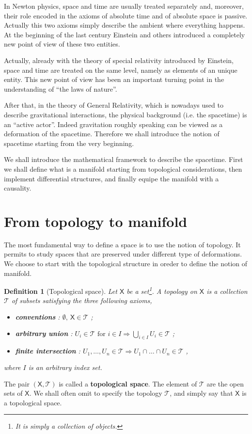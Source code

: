 \documentclass[11pt]{book}
\newcommand{\Tcal}{\mathcal{T}}
\newcommand{\Xsf}{\mathsf{X}}
\theoremstyle{break}
\newtheorem{definition}{Definition}[chapter]
\begin{document}
In Newton physics, space and time are usually treated separately and, moreover, their role encoded in the axioms of absolute time and of absolute space is passive. Actually this two axioms simply describe the ambient where everything happens. At the beginning of the last century Einstein and others introduced a completely new point of view of these two entities.


Actually, already with the theory of special relativity introduced by Einstein, space and time are treated on the same level, namely as elements of an unique entity. This new point of view has been an important turning point in the understanding of ``the laws of nature''.


After that, in the theory of General Relativity, which is nowadays used to describe gravitational interactions, the physical background (i.e. the spacetime) is an ``active actor''. Indeed gravitation roughly speaking can be viewed as a deformation of the spacetime. Therefore we shall introduce the notion of spacetime starting from the very beginning.


We shall introduce the mathematical framework to describe the spacetime. First we shall define what is a manifold starting from topological considerations, then implement differential structures, and finally equipe the manifold with a causality.


\section{From topology to manifold}
\label{p:TOPO_M}


The most fundamental way to define a space is to use the notion of topology. It permits to study spaces that are preserved under different type of deformations. We choose to start with the topological structure in oreder to define the notion of manifold.


\begin{definition}[Topological space] 
Let $\Xsf$ be a set\footnote{It is simply a collection of objects.}. A topology on $\Xsf$ is a collection $\Tcal$ of subsets satisfying the three following axioms,%
%
\begin{itemize}
\item \textbf{conventions} : $\emptyset , \ \Xsf \in \Tcal$ ;
\item \textbf{arbitrary union} : $U_i \in \Tcal \mbox{ for } i \in I \Longrightarrow \bigcup_{i\in I} U_i \in \Tcal$ ;
\item \textbf{finite intersection} : $U_1 , \dots , U_n \in \Tcal \Longrightarrow U_1 \cap \dots \cap U_n \in \Tcal$ ,
\end{itemize}
%
where $I$ is an arbitrary index set.
\end{definition}
%
The pair $(\Xsf,\Tcal)$ is called a \textbf{topological space}. The element of $\Tcal$ are the open sets of $\Xsf$. We shall often omit to specify the topology $\Tcal$, and simply say that $\Xsf$ is a topological space. 
\end{document}
